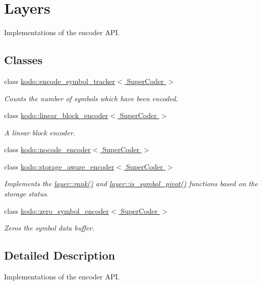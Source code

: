 \hypertarget{group__encoder__layers}{\section{Layers}
\label{group__encoder__layers}
}


Implementations of the encoder A\-P\-I.  


\subsection*{Classes}
\begin{DoxyCompactItemize}
\item 
class \hyperlink{classkodo_1_1encode__symbol__tracker}{kodo\-::encode\-\_\-symbol\-\_\-tracker$<$ Super\-Coder $>$}
\begin{DoxyCompactList}\small\item\em Counts the number of symbols which have been encoded. \end{DoxyCompactList}\item 
class \hyperlink{classkodo_1_1linear__block__encoder}{kodo\-::linear\-\_\-block\-\_\-encoder$<$ Super\-Coder $>$}
\begin{DoxyCompactList}\small\item\em A linear block encoder. \end{DoxyCompactList}\item 
class \hyperlink{classkodo_1_1nocode__encoder}{kodo\-::nocode\-\_\-encoder$<$ Super\-Coder $>$}
\item 
class \hyperlink{classkodo_1_1storage__aware__encoder}{kodo\-::storage\-\_\-aware\-\_\-encoder$<$ Super\-Coder $>$}
\begin{DoxyCompactList}\small\item\em Implements the \hyperlink{group__encoder__api_ga10c217148f82a6ed036563d3542cad72}{layer\-::rank()} and \hyperlink{group__encoder__api_ga72b86000f3b686b3d2791e71f4950dc6}{layer\-::is\-\_\-symbol\-\_\-pivot()} functions based on the storage status. \end{DoxyCompactList}\item 
class \hyperlink{classkodo_1_1zero__symbol__encoder}{kodo\-::zero\-\_\-symbol\-\_\-encoder$<$ Super\-Coder $>$}
\begin{DoxyCompactList}\small\item\em Zeros the symbol data buffer. \end{DoxyCompactList}\end{DoxyCompactItemize}


\subsection{Detailed Description}
Implementations of the encoder A\-P\-I. 